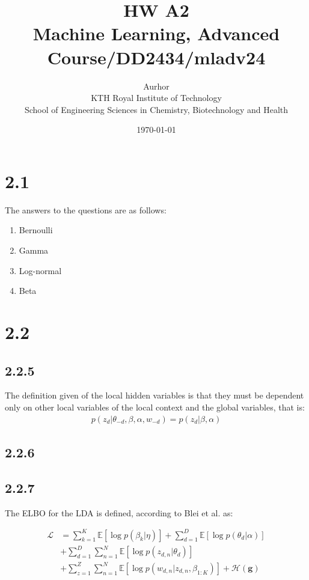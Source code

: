 \documentclass{article}
\title{HW A2\\\Large{Machine Learning, Advanced Course/DD2434/mladv24}}
\author{Aurhor \\ KTH Royal Institute of Technology\\ School of Engineering Sciences in Chemistry, Biotechnology and Health}
\date{\today}
\begin{document}
\maketitle

\fancyfoot[C]{\thepage}
\begin{multicols}{2}

    \section*{2.1}
    The answers to the questions are as follows:
    \begin{enumerate}[noitemsep, topsep=0pt]
        \item Bernoulli
        \item Gamma
        \item Log-normal
        \item Beta
    \end{enumerate}
    \section*{2.2}
    \subsection*{2.2.5} 
    The definition given of the local hidden variables is that they must be dependent
    only on other local variables of the local context and the global variables, that is:
    \begin{align}
        p(z_{d}|\theta_{-d}, \beta, \alpha, w_{-d}) = p(z_{d} | \beta, \alpha)
    \end{align}
    \subsection*{2.2.6}





    \subsection*{2.2.7}

    The ELBO for the LDA is defined, according to Blei et al. \cite{blei2009visualizing} as:
    
    \begin{equation}
        \begin{aligned}
            \mathcal{L} &= \sum_{k=1}^{K} \mathbb{E}[\log p(\beta_k | \eta)]+\sum_{d=1}^{D} \mathbb{E}[\log p(\theta_d | \alpha)] \\
            &+ \sum_{d=1}^{D} \sum_{n=1}^{N} \mathbb{E}[\log p(z_{d,n} | \theta_d)] \\
            &+ \sum_{z=1}^{Z} \sum_{n=1}^{N} \mathbb{E}[\log p(w_{d,n} | z_{d,n}, \beta_{1:K})] + \mathcal{H}(\mathbf{g})
        \end{aligned}
    \end{equation}


\end{multicols}
\end{document}
